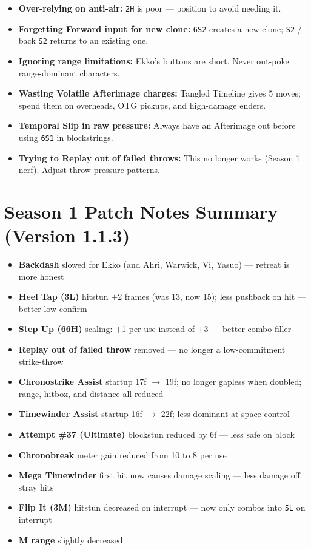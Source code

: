\documentclass[12pt, a4paper]{report}
\newcommand{\notation}[1]{{\small\texttt{\textcolor{ekkoBlue}{#1}}}}
\newcommand{\movename}[1]{\textbf{\textcolor{ekkoGold}{#1}}}
\begin{document}
\begin{itemize}
  \item \textbf{Over-relying on anti-air:} \notation{2H} is poor --- position to avoid needing it.
  \item \textbf{Forgetting Forward input for new clone:} \notation{6S2} creates a new clone; \notation{S2} / back \notation{S2} returns to an existing one.
  \item \textbf{Ignoring range limitations:} Ekko's buttons are short. Never out-poke range-dominant characters.
  \item \textbf{Wasting Volatile Afterimage charges:} Tangled Timeline gives 5 moves; spend them on overheads, OTG pickups, and high-damage enders.
  \item \textbf{Temporal Slip in raw pressure:} Always have an Afterimage out before using \notation{6S1} in blockstrings.
  \item \textbf{Trying to Replay out of failed throws:} This no longer works (Season 1 nerf). Adjust throw-pressure patterns.
\end{itemize}

\section{Season 1 Patch Notes Summary (Version 1.1.3)}

\begin{itemize}
  \item \movename{Backdash} slowed for Ekko (and Ahri, Warwick, Vi, Yasuo) --- retreat is more honest
  \item \movename{Heel Tap (3L)} hitstun $+$2 frames (was 13, now 15); less pushback on hit --- better low confirm
  \item \movename{Step Up (66H)} scaling: $+$1 per use instead of $+$3 --- better combo filler
  \item \movename{Replay out of failed throw} removed --- no longer a low-commitment strike-throw
  \item \movename{Chronostrike Assist} startup 17f $\to$ 19f; no longer gapless when doubled; range, hitbox, and distance all reduced
  \item \movename{Timewinder Assist} startup 16f $\to$ 22f; less dominant at space control
  \item \movename{Attempt \#37 (Ultimate)} blockstun reduced by 6f --- less safe on block
  \item \movename{Chronobreak} meter gain reduced from 10 to 8 per use
  \item \movename{Mega Timewinder} first hit now causes damage scaling --- less damage off stray hits
  \item \movename{Flip It (3M)} hitstun decreased on interrupt --- now only combos into \notation{5L} on interrupt
  \item \movename{M range} slightly decreased
\end{itemize}
\end{document}
